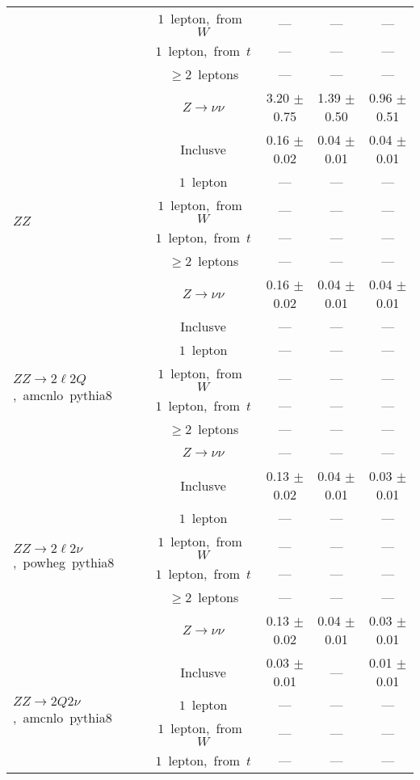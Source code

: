 \documentclass{article}
\begin{document}
\begin{longtable}{|l|c|c|c|c|}
 & $1$~lepton,~from~$W$  & ---  & ---  & --- \\* 
 & $1$~lepton,~from~$t$  & ---  & ---  & --- \\* 
 & $\ge2$~leptons  & ---  & ---  & --- \\* 
 & $Z\rightarrow\nu\nu$  & 3.20 $\pm$ 0.75  & 1.39 $\pm$ 0.50  & 0.96 $\pm$ 0.51 \\* 
\hline 
\multirow{6}{*}{$ZZ$} & Inclusve  & 0.16 $\pm$ 0.02  & 0.04 $\pm$ 0.01  & 0.04 $\pm$ 0.01 \\* 
 & $1$~lepton  & ---  & ---  & --- \\* 
 & $1$~lepton,~from~$W$  & ---  & ---  & --- \\* 
 & $1$~lepton,~from~$t$  & ---  & ---  & --- \\* 
 & $\ge2$~leptons  & ---  & ---  & --- \\* 
 & $Z\rightarrow\nu\nu$  & 0.16 $\pm$ 0.02  & 0.04 $\pm$ 0.01  & 0.04 $\pm$ 0.01 \\* 
\hline 
\multirow{6}{*}{$ZZ{\rightarrow}2{\ell}2Q$,~amcnlo~pythia8} & Inclusve  & ---  & ---  & --- \\* 
 & $1$~lepton  & ---  & ---  & --- \\* 
 & $1$~lepton,~from~$W$  & ---  & ---  & --- \\* 
 & $1$~lepton,~from~$t$  & ---  & ---  & --- \\* 
 & $\ge2$~leptons  & ---  & ---  & --- \\* 
 & $Z\rightarrow\nu\nu$  & ---  & ---  & --- \\* 
\hline 
\multirow{6}{*}{$ZZ{\rightarrow}2{\ell}2{\nu}$,~powheg~pythia8} & Inclusve  & 0.13 $\pm$ 0.02  & 0.04 $\pm$ 0.01  & 0.03 $\pm$ 0.01 \\* 
 & $1$~lepton  & ---  & ---  & --- \\* 
 & $1$~lepton,~from~$W$  & ---  & ---  & --- \\* 
 & $1$~lepton,~from~$t$  & ---  & ---  & --- \\* 
 & $\ge2$~leptons  & ---  & ---  & --- \\* 
 & $Z\rightarrow\nu\nu$  & 0.13 $\pm$ 0.02  & 0.04 $\pm$ 0.01  & 0.03 $\pm$ 0.01 \\* 
\hline 
\multirow{6}{*}{$ZZ{\rightarrow}2Q2{\nu}$,~amcnlo~pythia8} & Inclusve  & 0.03 $\pm$ 0.01  & ---  & 0.01 $\pm$ 0.01 \\* 
 & $1$~lepton  & ---  & ---  & --- \\* 
 & $1$~lepton,~from~$W$  & ---  & ---  & --- \\* 
 & $1$~lepton,~from~$t$  & ---  & ---  & --- \\* 

\end{longtable}
\end{document}
